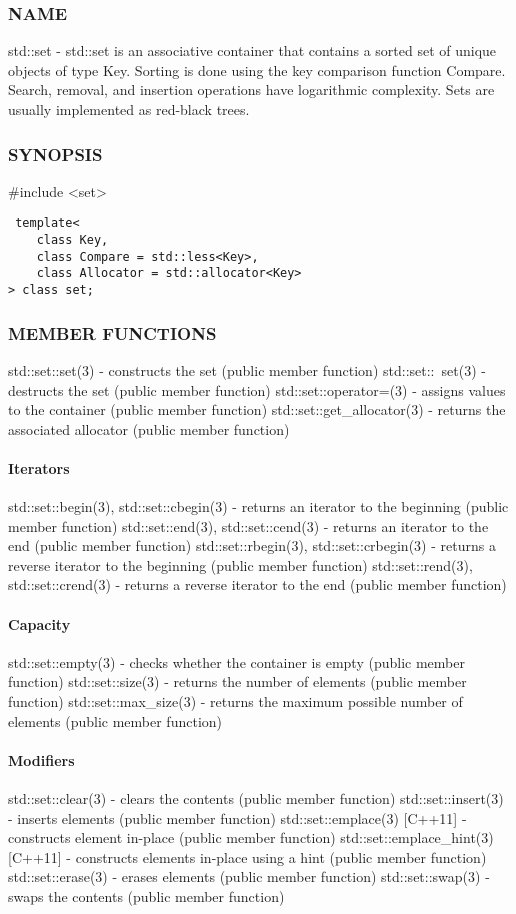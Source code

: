 \subsubsection{NAME}
std::set - std::set is an associative container that contains a sorted set of unique objects of type Key. Sorting is done using the key comparison function Compare. Search, removal, and insertion operations have logarithmic complexity. Sets are usually implemented as red-black trees.

\subsubsection{SYNOPSIS}
\#include <set>

\begin{lstlisting}
 template<
    class Key,
    class Compare = std::less<Key>,
    class Allocator = std::allocator<Key>
> class set;
\end{lstlisting}

\subsubsection{MEMBER FUNCTIONS}
std::set::set(3) - constructs the set  (public member function)
std::set::~set(3) - destructs the set  (public member function)
std::set::operator=(3) - assigns values to the container   (public member function)
std::set::get\_allocator(3) - returns the associated allocator   (public member function)
\paragraph{Iterators}
std::set::begin(3), std::set::cbegin(3) - returns an iterator to the beginning   (public member function)
std::set::end(3), std::set::cend(3) - returns an iterator to the end   (public member function)
std::set::rbegin(3), std::set::crbegin(3) - returns a reverse iterator to the beginning   (public member function)
std::set::rend(3), std::set::crend(3) - returns a reverse iterator to the end   (public member function)
\paragraph{Capacity}
std::set::empty(3) - checks whether the container is empty   (public member function)
std::set::size(3) - returns the number of elements   (public member function)
std::set::max\_size(3) - returns the maximum possible number of elements   (public member function)
\paragraph{Modifiers}
std::set::clear(3) - clears the contents   (public member function)
std::set::insert(3) - inserts elements   (public member function)
std::set::emplace(3) [C++11] - constructs element in-place   (public member function)
std::set::emplace\_hint(3) [C++11] - constructs elements in-place using a hint   (public member function)
std::set::erase(3) - erases elements   (public member function)
std::set::swap(3) - swaps the contents   (public member function)
